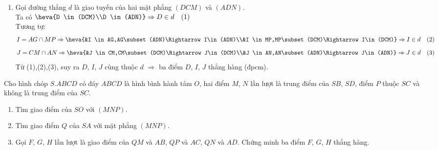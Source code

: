 \begin{bt}
\begin{vd}
{\begin{enumerate}
			Từ $(1)$, $(2)$ suy ra $(ADN)\cap(ABP)=AG$.
			\item Gọi đường thẳng $d$ là giao tuyến của hai mặt phẳng $(DCM)$ và $(ADN)$.\\
			Ta có $\heva{D \in (DCM)\\D \in (ADN)}\Rightarrow D\in d\quad (1)$\\
			Tương tự:\\
			$$I=AG\cap MP \Rightarrow \heva{&I \in AG,AG\subset (ADN)\Rightarrow I\in(ADN)\\&I \in MP,MP\subset (DCM)\Rightarrow I\in(DCM)}\Rightarrow I\in d\quad (2)$$
			$$J=CM\cap AN \Rightarrow \heva{&J \in CM,CM\subset (DCM)\Rightarrow J\in(DCM)\\&J \in AN,AN\subset (ADN)\Rightarrow J\in(ADN)}\Rightarrow J\in d\quad (3)$$
			Từ (1),(2),(3), suy ra $D$, $I$, $J$ cùng thuộc $d$ $\Rightarrow$ ba điểm $D$, $I$, $J$ thẳng hàng (đpcm).
		\end{enumerate}	
	}
\end{vd}
\begin{vd}%
	Cho hình chóp $S.ABCD$ có đáy $ABCD$ là hình bình hành tâm $O$, hai điểm $M$, $N$ lần lượt
	là trung điểm của $SB$, $SD$, điểm $P$ thuộc $SC$ và không là trung điểm của $SC$.
	\begin{enumerate}
		\item Tìm giao điểm của $SO$ với $(MNP)$.
		\item Tìm giao điểm $Q$ của $SA$ với mặt phẳng $(MNP)$.
		\item Gọi $F$, $G$, $H$ lần lượt là giao điểm của $QM$ và $AB$, $QP$ và $AC$, $QN$ và $AD$. Chứng
		minh ba điểm $F$, $G$, $H$ thẳng hàng.
	\end{enumerate}	
\end{vd}
\end{bt}
